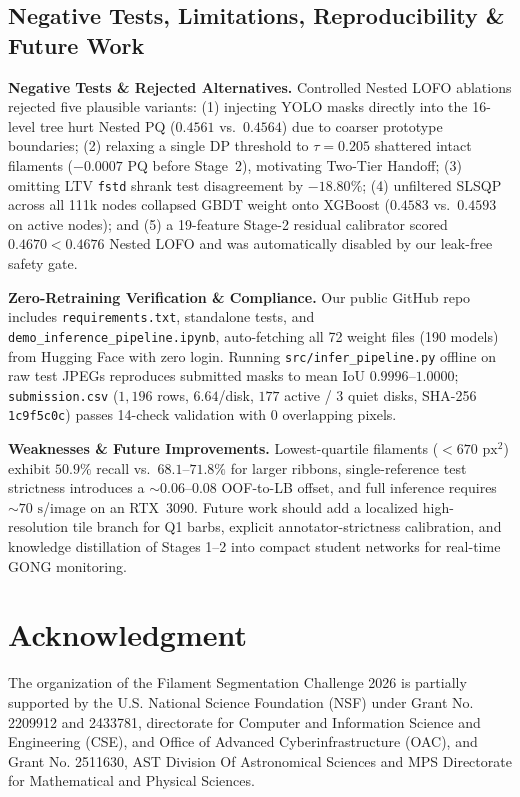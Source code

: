 \documentclass[sigconf]{acmart}
\begin{document}
\subsection{Negative Tests, Limitations, Reproducibility \& Future Work}
\textbf{Negative Tests \& Rejected Alternatives.}
Controlled Nested LOFO ablations rejected five plausible variants: (1) injecting YOLO masks directly into the 16-level tree hurt Nested PQ ($0.4561$ vs.\ $0.4564$) due to coarser prototype boundaries; (2) relaxing a single DP threshold to $\tau{=}0.205$ shattered intact filaments ($-0.0007$ PQ before Stage~2), motivating Two-Tier Handoff; (3) omitting LTV \texttt{fstd} shrank test disagreement by $-18.80\%$; (4) unfiltered SLSQP across all 111k nodes collapsed GBDT weight onto XGBoost ($0.4583$ vs.\ $0.4593$ on active nodes); and (5) a 19-feature Stage-2 residual calibrator scored $0.4670 < 0.4676$ Nested LOFO and was automatically disabled by our leak-free safety gate.

\textbf{Zero-Retraining Verification \& Compliance.}
Our public GitHub repo includes \texttt{requirements.txt}, standalone tests, and \texttt{demo\_inference\_pipeline.ipynb}, auto-fetching all 72 weight files (190 models) from Hugging Face with zero login. Running \texttt{src/infer\_pipeline.py} offline on raw test JPEGs reproduces submitted masks to mean IoU $0.9996\text{--}1.0000$; \texttt{submission.csv} ($1{,}196$ rows, $6.64$/disk, $177$ active / $3$ quiet disks, SHA-256 \texttt{1c9f5c0c}) passes 14-check validation with $0$ overlapping pixels.

\textbf{Weaknesses \& Future Improvements.}
Lowest-quartile filaments ($<670\text{ px}^2$) exhibit $50.9\%$ recall vs.\ $68.1\text{--}71.8\%$ for larger ribbons, single-reference test strictness introduces a ${\sim}0.06\text{--}0.08$ OOF-to-LB offset, and full inference requires ${\sim}70\text{ s}$/image on an RTX~3090. Future work should add a localized high-resolution tile branch for Q1 barbs, explicit annotator-strictness calibration, and knowledge distillation of Stages 1--2 into compact student networks for real-time GONG monitoring.

\section{Acknowledgment}\label{sec:acknowledgment}
    The organization of the Filament Segmentation Challenge 2026 is partially supported by the U.S. National Science Foundation (NSF) under Grant No. 2209912 and 2433781, directorate for Computer and Information Science and Engineering (CSE), and Office of Advanced Cyberinfrastructure (OAC), and Grant No. 2511630, AST Division Of Astronomical Sciences and MPS Directorate for Mathematical and Physical Sciences.
\end{document}
